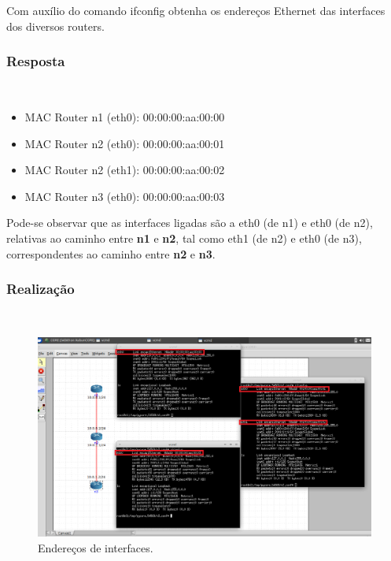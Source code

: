 \documentclass{llncs}
\begin{document}
Com auxílio do comando ifconfig obtenha os endereços Ethernet das interfaces dos diversos routers.

\subsubsection{Resposta}\rule[-10pt]{0pt}{10pt}\\

\begin{itemize}
  \item MAC Router n1 (eth0): 00:00:00:aa:00:00
  \item MAC Router n2 (eth0): 00:00:00:aa:00:01
  \item MAC Router n2 (eth1): 00:00:00:aa:00:02
  \item MAC Router n3 (eth0): 00:00:00:aa:00:03
\end{itemize}

Pode-se observar que as interfaces ligadas são a eth0 (de n1) e eth0 (de n2), relativas ao caminho entre \textbf{n1} e \textbf{n2}, tal como eth1 (de n2) e eth0 (de n3), correspondentes ao caminho entre \textbf{n2} e \textbf{n3}.

\subsubsection{Realização}\rule[-10pt]{0pt}{10pt}\\

\begin{figure}
  \begin{center}
    \includegraphics[scale=0.6]{./imagens/ifconfig.png} 
  \end{center}
  \caption{Endereços de interfaces.}
  \label{fig:arp_reply_resp}
\end{figure} 
\end{document}
